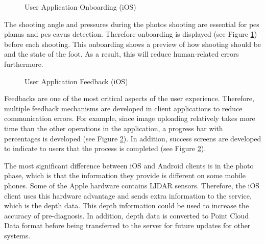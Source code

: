 \begin{figure}[htbp]
\centering
{}
\caption{User Application Onboarding (iOS)}
\label{fig:UserApplicationOnboarding}
\end{figure}

The shooting angle and pressures during the photos shooting are essential for pes planus and pes cavus detection. Therefore onboarding is displayed (see Figure \ref{fig:UserApplicationOnboarding}) before each shooting. This onboarding shows a preview of how shooting should be and the state of the foot. As a result, this will reduce human-related errors furthermore. 

\begin{figure}[htbp]
\centering
{}
\caption{User Application Feedback (iOS)}
\label{fig:UserApplicationFeedback}
\end{figure}

Feedbacks are one of the most critical aspects of the user experience.  Therefore, multiple feedback mechanisms are developed in client applications to reduce communication errors. For example, since image uploading relatively takes more time than the other operations in the application, a progress bar with percentages is developed (see Figure \ref{fig:UserApplicationFeedback}). In addition, success screens are developed to indicate to users that the process is completed (see Figure \ref{fig:UserApplicationFeedback}).  

The most significant difference between iOS and Android clients is in the photo phase, which is that the information they provide is different on some mobile phones. Some of the Apple hardware contains LIDAR sensors. Therefore, the iOS client uses this hardware advantage and sends extra information to the service, which is the depth data. This depth information could be used to increase the accuracy of pre-diagnosis. In addition, depth data is converted to Point Cloud Data format before being transferred to the server for future updates for other systems.

